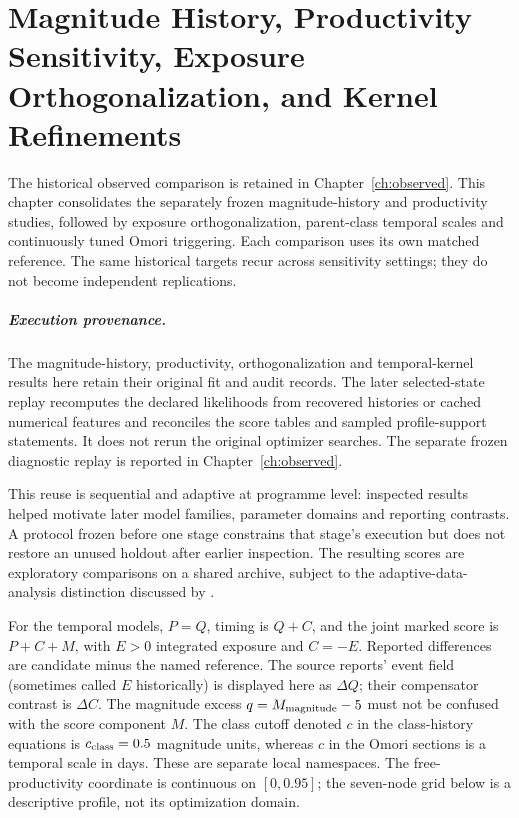 \chapter{Magnitude History, Productivity Sensitivity, Exposure Orthogonalization, and Kernel Refinements}
\label{ch:temporal-extensions}\label{chap:temporal-extensions}
The historical observed comparison is retained in Chapter~\ref{ch:observed}.
This chapter consolidates the separately frozen magnitude-history and
productivity studies, followed by exposure orthogonalization, parent-class
temporal scales and continuously tuned Omori triggering. Each comparison uses
its own matched reference. The same historical targets recur across sensitivity
settings; they do not become independent replications.

\paragraph{Execution provenance.}
The magnitude-history, productivity, orthogonalization and temporal-kernel results here retain their original fit and audit records. The later selected-state replay recomputes the declared likelihoods from recovered histories or cached numerical features and reconciles the score tables and sampled profile-support statements. It does not rerun the original optimizer searches. The separate frozen diagnostic replay is reported in Chapter~\ref{ch:observed}.

This reuse is sequential and adaptive at programme level: inspected results helped motivate later model families, parameter domains and reporting contrasts. A protocol frozen before one stage constrains that stage's execution but does not restore an unused holdout after earlier inspection. The resulting scores are exploratory comparisons on a shared archive, subject to the adaptive-data-analysis distinction discussed by \citet{Dwork2015}.

For the temporal models, $P=Q$, timing is $Q+C$, and the joint marked score is
$P+C+M$, with $E>0$ integrated exposure and $C=-E$. Reported differences are
candidate minus the named reference. The source reports' event field (sometimes
called $E$ historically) is displayed here as $\Delta Q$; their compensator
contrast is $\Delta C$. The magnitude excess $q=M_{\rm magnitude}-5$ must not
be confused with the score component $M$. The class cutoff denoted $c$ in the
class-history equations is $c_{\rm class}=0.5$ magnitude units, whereas $c$
in the Omori sections is a temporal scale in days. These are separate local
namespaces. The free-productivity coordinate is continuous on $[0,0.95]$;
the seven-node grid below is a descriptive profile, not its optimization domain.


